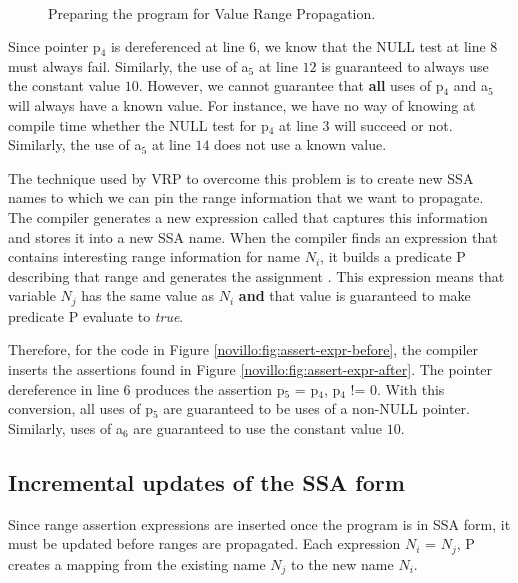 \begin{figure}
    \centering
    \ \hspace{3em}
    \caption{Preparing the program for Value Range Propagation.}
\end{figure}

Since pointer p$_4$ is dereferenced at line $6$, we know that the
NULL test at line $8$ must always fail.  Similarly, the use of
a$_5$ at line $12$ is guaranteed to always use the constant value
$10$.  However, we cannot guarantee that \textbf{all} uses of
p$_4$ and a$_5$ will always have a known value.  For instance,
we have no way of knowing at compile time whether the NULL test
for p$_4$ at line $3$ will succeed or not.  Similarly, the use of
a$_5$ at line $14$ does not use a known value.

The technique used by VRP to overcome this problem is to create
new SSA names to which we can pin the range information that we
want to propagate.  The compiler generates a new expression called
 that captures this information and stores it
into a new SSA name.  When the compiler finds an expression that
contains interesting range information for name $N_i$, it
builds a predicate P describing that range and generates
the assignment .  This
expression means that variable $N_j$ has the same value as $N_i$
\textbf{and} that value is guaranteed to make predicate P
evaluate to \textit{true}.

Therefore, for the code in Figure
\ref{novillo:fig:assert-expr-before}, the compiler inserts the
assertions found in Figure \ref{novillo:fig:assert-expr-after}.
The pointer dereference in line $6$ produces the assertion
p$_5$ = p$_4$, p$_4$ != $0$\lcode{>}.  With
this conversion, all uses of p$_5$ are guaranteed to be uses of a
non-NULL pointer.  Similarly, uses of a$_6$ are guaranteed to use
the constant value $10$.

\subsection{Incremental updates of the SSA form}

Since range assertion expressions are inserted once the program
is in SSA form, it must be updated before ranges are propagated.
Each expression $N_i$ = $N_j$, P\lcode{>}
creates a mapping from the existing name $N_j$ to the new name
$N_i$.

